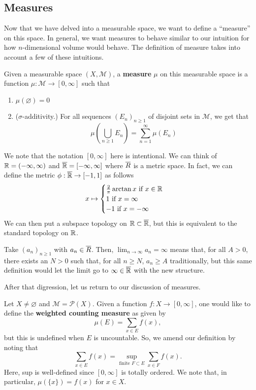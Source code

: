 \documentclass[11pt,leqno,oneside]{amsbook}
\numberwithin{thm}{section}
\renewcommand{\P}{\mathcal{P}} %
\newcommand{\M}{\mathcal{M}} %
\newcommand{\s}{$\sigma$-} %
\renewcommand{\emptyset}{\varnothing}
\renewcommand{\de}{\textbf} %
\begin{document}
\subsection{Measures}
Now that we have delved into a measurable space, we want to define a
``measure'' on this space. In general, we want measures to behave
similar to our intuition for how $n$-dimensional volume would
behave. The definition of measure takes into account a few of these intuitions.
\begin{defn}
  Given a measurable space $(X,\M)$, a \de{measure} $\mu$ on this
  measurable space is a function $\mu: \M \to [0,\infty]$ such that
  \begin{enumerate}
  \item $\mu(\emptyset) = 0$
  \item (\s additivity.) For all sequences $(E_n)_{n \geq 1}$ of
    disjoint sets in $\M$, we get that \[
      \mu(\bigcup_{n \geq 1} E_n) = \sum_{n=1}^\infty \mu(E_n)
    \]
  \end{enumerate}
\end{defn}
We note that the notation $[0,\infty]$ here is intentional. We can
think of ${\mathbb R} = (-\infty,\infty)$ and $\overline{{\mathbb R}} = [-\infty,\infty]$
where $\overline{R}$ is a metric space. In fact, we can define the metric
$\phi: \overline{{\mathbb R}} \to [-1,1]$ as follows \[
  x \mapsto
  \begin{cases}
    \frac{2}{\pi} \arctan x \text{ if } x \in {\mathbb R} \\
    1 \text{ if } x = \infty \\
    -1 \text{ if } x = -\infty
  \end{cases}
\]
We can then put a subspace topology on ${\mathbb R} \subset \overline{{\mathbb R}}$, but this is
equivalent to the standard topology on ${\mathbb R}$.
\begin{example}
  Take $(a_n)_{n \geq 1}$ with $a_n \in \overline{R}$. Then, $\lim_{n \to \infty} a_n =
  \infty$ means that, for all $A > 0$, there exists an $N > 0$ such
  that, for all $n \geq N$, $a_n \geq A$ traditionally, but this same
  definition would let the limit go to $\infty \in \overline{{\mathbb R}}$ with the
  new structure.
\end{example}
After that digression, let us return to our discussion of measures.
\begin{defn}
  Let $X \neq \emptyset$ and $\M = \P(X)$. Given a function $f: X \to
  [0,\infty]$, one would like to define the \de{weighted counting measure} as given by \[
    \mu(E) = \sum_{x \in E} f(x),
  \]
  but this is undefined when $E$ is uncountable. So, we amend our
  definition by noting that \[
    \sum_{x \in E} f(x) = \sup_{\text{finite } F \subset E} \sum_{x \in
    F} f(x).
\]
  Here, sup is well-defined since $[0,\infty]$ is totally ordered. We
  note that,
  in particular, $\mu(\{x\}) = f(x)$ for $x \in X$.
\end{defn}
\end{document}
